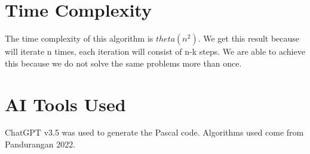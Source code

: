 \documentclass[conference]{IEEEtran}
\begin{document}
\section{Time Complexity}
The time complexity of this algorithm is $theta(n^2)$. We get this result because will iterate n times, each iteration will consist of n-k steps. We are able to achieve this because we do not solve the same problems more than once.

\section{AI Tools Used}
ChatGPT v3.5 was used to generate the Pascal code. Algorithms used come from Pandurangan 2022.
\end{document}
